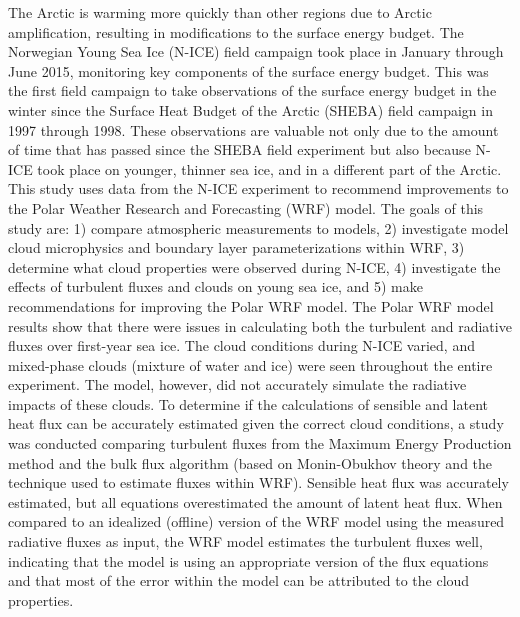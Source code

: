 The Arctic is warming more quickly than other regions due to Arctic amplification, resulting in modifications to the surface energy budget. The Norwegian Young Sea Ice (N-ICE) field campaign took place in January through June 2015, monitoring key components of the surface energy budget. This was the first field campaign to take observations of the surface energy budget in the winter since the Surface Heat Budget of the Arctic (SHEBA) field campaign in 1997 through 1998. These observations are valuable not only due to the amount of time that has passed since the SHEBA field experiment but also because N-ICE took place on younger, thinner sea ice, and in a different part of the Arctic. This study uses data from the N-ICE experiment to recommend improvements to the Polar Weather Research and Forecasting (WRF) model. The goals of this study are: 1) compare atmospheric measurements to models, 2) investigate model cloud microphysics and boundary layer parameterizations within WRF, 3) determine what cloud properties were observed during N-ICE, 4) investigate the effects of turbulent fluxes and clouds on young sea ice, and 5) make recommendations for improving the Polar WRF model. The Polar WRF model results show that there were issues in calculating both the turbulent and radiative fluxes over first-year sea ice. The cloud conditions during N-ICE varied, and mixed-phase clouds (mixture of water and ice) were seen throughout the entire experiment. The model, however, did not accurately simulate the radiative impacts of these clouds. To determine if the calculations of sensible and latent heat flux can be accurately estimated given the correct cloud conditions, a study was conducted comparing turbulent fluxes from the Maximum Energy Production method and the bulk flux algorithm (based on Monin-Obukhov theory and the technique used to estimate fluxes within WRF). Sensible heat flux was accurately estimated, but all equations overestimated the amount of latent heat flux. When compared to an idealized (offline) version of the WRF model using the measured radiative fluxes as input, the WRF model estimates the turbulent fluxes well, indicating that the model is using an appropriate version of the flux equations and that most of the error within the model can be attributed to the cloud properties.